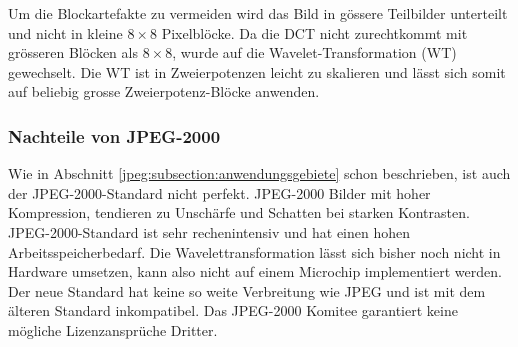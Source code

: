 Um die Blockartefakte zu vermeiden wird das Bild in gössere Teilbilder unterteilt und nicht in kleine \(8\times8\) Pixelblöcke.
Da die DCT nicht zurechtkommt mit grösseren Blöcken als \(8\times8\), wurde auf die Wavelet-Transformation (WT) gewechselt.
Die WT ist in Zweierpotenzen leicht zu skalieren und lässt sich somit auf beliebig grosse Zweierpotenz-Blöcke anwenden.

\subsubsection{Nachteile von JPEG-2000
\label{jpeg:subsubsection:nachteil}}
Wie in Abschnitt \ref{jpeg:subsection:anwendungsgebiete} schon beschrieben, ist auch der JPEG-2000-Standard nicht perfekt.
JPEG-2000 Bilder mit hoher Kompression, tendieren zu Unschärfe und Schatten bei starken Kontrasten. 
JPEG-2000-Standard ist sehr rechenintensiv und hat einen hohen Arbeitsspeicherbedarf. 
Die Wavelettransformation lässt sich bisher noch nicht in Hardware umsetzen, kann also nicht auf einem Microchip implementiert werden.
Der neue Standard hat keine so weite Verbreitung wie JPEG und ist mit dem älteren Standard inkompatibel.
Das JPEG-2000 Komitee garantiert keine mögliche Lizenzansprüche Dritter.
